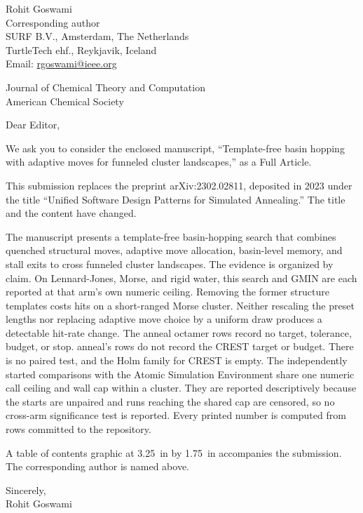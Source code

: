 \documentclass[11pt]{article}
\begin{document}
\noindent Rohit Goswami\\
Corresponding author\\
SURF B.V., Amsterdam, The Netherlands\\
TurtleTech ehf., Reykjavik, Iceland\\
Email: \url{rgoswami@ieee.org}

\vspace{1em}
\noindent Journal of Chemical Theory and Computation\\
American Chemical Society

\vspace{1em}
\noindent Dear Editor,

We ask you to consider the enclosed manuscript, ``Template-free basin
hopping with adaptive moves for funneled cluster landscapes,'' as a Full
Article.

This submission replaces the preprint arXiv:2302.02811, deposited in 2023
under the title ``Unified Software Design Patterns for Simulated Annealing.''
The title and the content have changed.

The manuscript presents a template-free basin-hopping search that combines
quenched structural moves, adaptive move allocation, basin-level memory, and
stall exits to cross funneled cluster landscapes.
The evidence is organized by claim.
On Lennard-Jones, Morse, and rigid water, this search and GMIN are each
reported at that arm's own numeric ceiling.
Removing the former structure templates costs hits on a short-ranged Morse
cluster.
Neither rescaling the preset lengths nor replacing adaptive move choice by a
uniform draw produces a detectable hit-rate change.
The anneal octamer rows record no target, tolerance, budget, or stop.
anneal's rows do not record the CREST target or budget.
There is no paired test, and the Holm family for CREST is empty.
The independently started comparisons with the Atomic
Simulation Environment share one numeric call ceiling and wall cap
within a cluster.
They are reported descriptively because the starts are unpaired and
runs reaching the shared cap are censored, so no cross-arm
significance test is reported.
Every printed number is computed from rows committed to the repository.

A table of contents graphic at 3.25~in by 1.75~in accompanies the submission.
The corresponding author is named above.

\vspace{1em}
\noindent Sincerely,\\
Rohit Goswami
\end{document}
